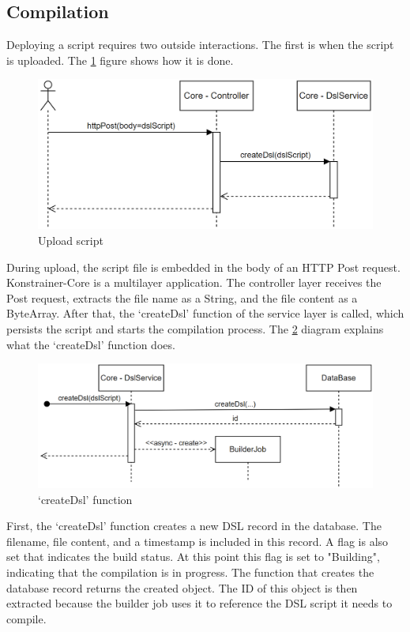 \subsection{Compilation}

Deploying a script requires two outside interactions. The first is when the script is uploaded. The \ref{fig:seq0} figure shows how it is done.

\begin{figure}[h]
    \centering
    \includegraphics[width=130mm, keepaspectratio]{seq0.png}
    \caption{Upload script}
    \label{fig:seq0}
\end{figure}

During upload, the script file is embedded in the body of an HTTP Post request. Konstrainer-Core is a multilayer application. The controller layer receives the Post request, extracts the file name as a String, and the file content as a ByteArray. After that, the `createDsl' function of the service layer is called, which persists the script and starts the compilation process. The \ref{fig:seq1} diagram explains what the `createDsl' function does.

\begin{figure}[h]
    \centering
    \includegraphics[width=130mm, keepaspectratio]{seq1.png}
    \caption{`createDsl' function}
    \label{fig:seq1}
\end{figure}

First, the `createDsl' function creates a new DSL record in the database. The filename, file content, and a timestamp is included in this record. A flag is also set that indicates the build status. At this point this flag is set to "Building", indicating that the compilation is in progress. The function that creates the database record returns the created object. The ID of this object is then extracted because the builder job uses it to reference the DSL script it needs to compile.

